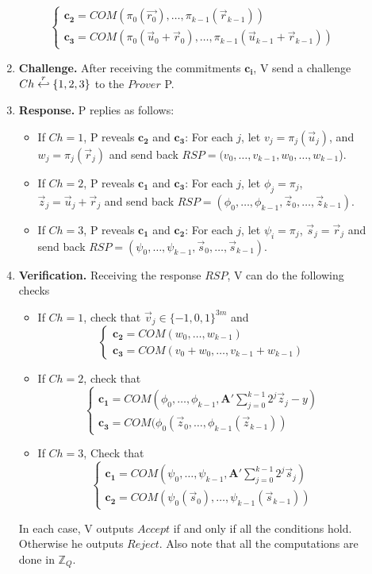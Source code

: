 \begin{description}
\begin{enumerate}
\[\begin{cases}
        \mathbf{c_2} = COM(\pi_0(\vec{r_0}), \dots,
        \pi_{k-1}(\vec{r}_{k-1}))\\
        \mathbf{c_3} = COM(\pi_0(\vec{u}_0 + \vec{r}_0), \dots, \pi_{k-1}(\vec{u}_{k-1} + \vec{r}_{k-1}))
      \end{cases}
    \]
  \item \textbf{Challenge.} After receiving the commitments $\mathbf{c_i}$, V send a challenge
    $Ch \stackrel{r}{\hookleftarrow} \{1,2,3\}$ to the $Prover$ P.
  \item \textbf{Response.} P replies as follows:
    \begin{itemize}
    \item If $Ch = 1$, P reveals $\mathbf{c_2}$ and $\mathbf{c_3}$: For each $j$, let $v_j = \pi_j(\vec{u}_j)$, and
      $w_j = \pi_j(\vec{r}_j)$ and send back $RSP = (v_0,\dots, v_{k-1},w_0,\dots,w_{k-1}$).
    \item If $Ch = 2$, P reveals $\mathbf{c_1}$ and $\mathbf{c_3}$: For each $j$, let $\phi_j = \pi_j$,
      $\vec{z}_j = \vec{u}_j +\vec{r}_j$ and send back
      $RSP = (\phi_0,\dots,\phi_{k-1}, \vec{z}_0, \dots, \vec{z}_{k-1})$.
    \item If $Ch = 3$, P reveals $\mathbf{c_1}$ and $\mathbf{c_2}$: For each $j$, let $\psi_i = \pi_j$,
      $\vec{s}_j = \vec{r}_j$ and send back $RSP = (\psi_0, \dots, \psi_{k-1}, \vec{s}_0, \dots, \vec{s}_{k-1})$.
    \end{itemize}
  \item \textbf{Verification.} Receiving the response $RSP$, V can do the following checks
    \begin{itemize}
    \item If $Ch = 1$, check that $\vec{v}_j \in \{-1,0,1\}^{3m}$ and
      \[
        \begin{cases}
          \mathbf{c_2} = COM(w_0,\dots,w_{k-1})\\
          \mathbf{c_3} = COM(v_0 + w_0, \dots, v_{k-1} + w_{k-1})
        \end{cases}
      \]
    \item If $Ch = 2$, check that
      \[
        \begin{cases}
          \mathbf{c_1} = COM(\phi_0,\dots,\phi_{k-1},\mathbf{A'}
          \sum_{j=0}^{k-1}2^j\vec{z}_j - y)\\
          \mathbf{c_3} = COM(\phi_0(\vec{z}_0,\dots,\phi_{k-1}( \vec{z}_{k-1}))
        \end{cases}
      \]
    \item If $Ch = 3$, Check that
      \[
        \begin{cases}
          \mathbf{c_1} = COM(\psi_0, \dots, \psi_{k-1}, \mathbf{A'}
          \sum_{j=0}^{k-1}2^j\vec{s}_j)\\
          \mathbf{c_2} = COM(\psi_0(\vec{s}_0),\dots, \psi_{k-1}( \vec{s}_{k-1}))
        \end{cases}
      \]
    \end{itemize}
    In each case, V outputs $Accept$ if and only if all the conditions hold. Otherwise he outputs $Reject$. Also note
    that all the computations are done in $\mathbb{Z}_Q$.


\end{enumerate}
\end{description}
